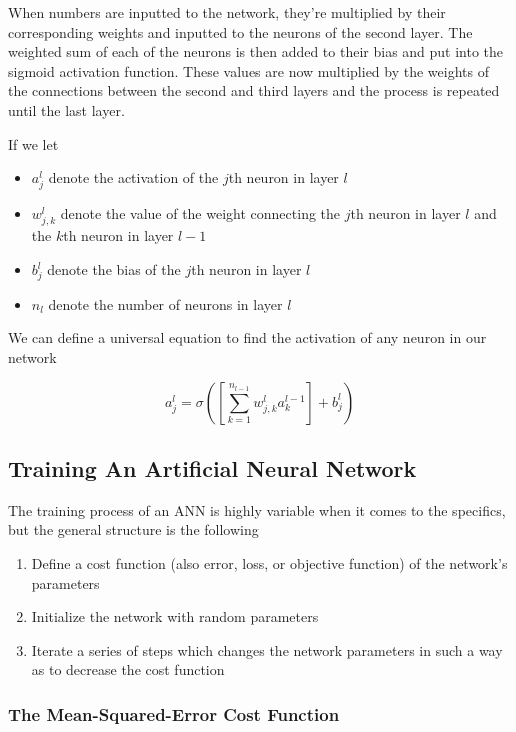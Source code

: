 \documentclass{article}
\begin{document}
When numbers are inputted to the network, they're multiplied by their corresponding weights and inputted to the neurons of the second layer. The weighted sum of each of the neurons is then added to their bias and put into the sigmoid activation function. These values are now multiplied by the weights of the connections between the second and third layers and the process is repeated until the last layer.

If we let

\begin{itemize}
    \item $a_{j}^{l}$ denote the activation of the $j$th neuron in layer $l$
    \item $w_{j, k}^{l}$ denote the value of the weight connecting the $j$th neuron in layer $l$ and the $k$th neuron in layer $l-1$
    \item $b_{j}^{l}$ denote the bias of the $j$th neuron in layer $l$
    \item $n_{l}$ denote the number of neurons in layer $l$
\end{itemize}

We can define a universal equation to find the activation of any neuron in our network

\large
\begin{equation}
    a_{j}^{l}=\sigma\left(\left[\sum_{k=1}^{n_{l-1}}{w_{j, k}^{l}a_{k}^{l-1}}\right]+b_{j}^{l}\right)
\end{equation}
\normalsize

\subsection{Training An Artificial Neural Network}
The training process of an ANN is highly variable when it comes to the specifics, but the general structure is the following
\begin{enumerate}
    \item Define a cost function (also error, loss, or objective function) of the network's parameters
    \item Initialize the network with random parameters
    \item Iterate a series of steps which changes the network parameters in such a way as to decrease the cost function
\end{enumerate}

\subsubsection{The Mean-Squared-Error Cost Function}
\end{document}
